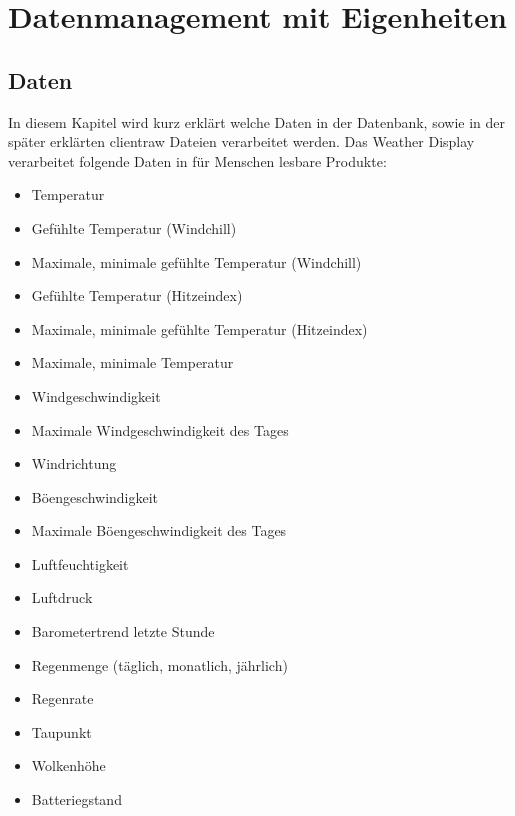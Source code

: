 \section{Datenmanagement mit Eigenheiten}

\subsection{Daten}
In diesem Kapitel wird kurz erklärt welche Daten in der Datenbank, sowie in der später erklärten clientraw Dateien verarbeitet werden. Das Weather Display verarbeitet folgende Daten in für Menschen lesbare Produkte:
\begin{itemize}
\item Temperatur
\item Gefühlte Temperatur (Windchill)
\item Maximale, minimale gefühlte Temperatur (Windchill)
\item Gefühlte Temperatur (Hitzeindex)
\item Maximale, minimale gefühlte Temperatur (Hitzeindex)
\item Maximale, minimale Temperatur 
\item Windgeschwindigkeit
\item Maximale Windgeschwindigkeit des Tages 
\item Windrichtung
\item Böengeschwindigkeit
\item Maximale Böengeschwindigkeit des Tages
\item Luftfeuchtigkeit
\item Luftdruck
\item Barometertrend letzte Stunde
\item Regenmenge (täglich, monatlich, jährlich)
\item Regenrate
\item Taupunkt
\item Wolkenhöhe
\item Batteriegstand




\end{itemize}

